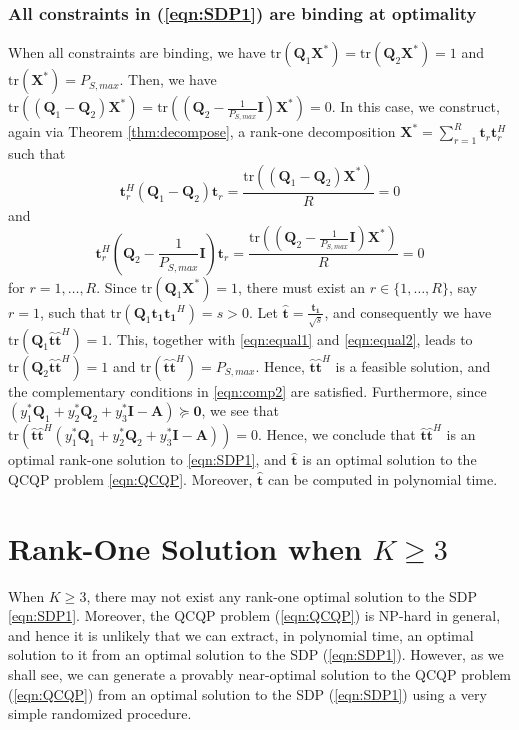 \documentclass[twocolumn,10pt]{IEEEtran}
\theoremstyle{plain} \newtheorem{theorem}{Theorem}
\theoremstyle{plain} \newtheorem{proposition}{Proposition}
\theoremstyle{plain} \newtheorem{corollary}{Corollary}
\theoremstyle{remark} \newtheorem{remark}{Remark}
\theoremstyle{remark} \newtheorem{lemma}{Lemma}
\theoremstyle{plain} \newtheorem{definition}{Definition}
\theoremstyle{plain} \newtheorem{assumption}{Assumption}
\theoremstyle{plain} \newtheorem{fact}{Fact}
\begin{document}
\subsubsection{\textbf{All constraints in (\ref{eqn:SDP1}) are binding at optimality}}
When all constraints are binding, we have $\mathrm{tr}(\mathbf{Q}_1\mathbf{X}^*)=\mathrm{tr}(\mathbf{Q}_2\mathbf{X}^*)=1$ and $\mathrm{tr}(\mathbf{X}^*)=P_{S,max}$. Then, we have $\mathrm{tr}((\mathbf{Q}_1-\mathbf{Q}_2)\mathbf{X}^*)=\mathrm{tr}((\mathbf{Q}_2-\frac{1}{P_{S,max}}\mathbf{I})\mathbf{X}^*)=0$.  In this case, we construct, again via Theorem \ref{thm:decompose}, a rank-one decomposition $\mathbf{X^*}=\sum_{r=1}^R\mathbf{t}_r\mathbf{t}_r^H$ such that
\begin{equation} \label{eqn:equal1}
   \mathbf{t}_r^H\left(\mathbf{Q}_1-\mathbf{Q}_2\right)\mathbf{t}_r = \frac{\mathrm{tr}\left((\mathbf{Q}_1-\mathbf{Q}_2)\mathbf{X^*}\right)}{R} = 0
\end{equation}
and
\begin{equation} \label{eqn:equal2}
   \mathbf{t}_r^H\left(\mathbf{Q}_2-\frac{1}{P_{S,max}}\mathbf{I}\right)\mathbf{t}_r = \frac{\mathrm{tr}\left(\left(\mathbf{Q}_2-\frac{1}{P_{S,max}}\mathbf{I}\right)\mathbf{X^*}\right)}{R} = 0
\end{equation}
for $r=1,\ldots,R$.  Since $\mathrm{tr}(\mathbf{Q}_1\mathbf{X}^*)=1$, there must exist an $r\in\{1,\ldots,R\}$, say $r=1$, such that $\mathrm{tr}(\mathbf{Q}_1\mathbf{t_1}\mathbf{t_1}^H)=s>0$. Let $\mathbf{\hat{t}}=\frac{\mathbf{t_1}}{\sqrt{s}}$, and consequently we have $\mathrm{tr}(\mathbf{Q}_1\mathbf{\hat{t}}\mathbf{\hat{t}}^H)=1$.  This, together with \eqref{eqn:equal1} and \eqref{eqn:equal2}, leads to $\mathrm{tr}(\mathbf{Q}_2\mathbf{\hat{t}}\mathbf{\hat{t}}^H)=1$ and $\mathrm{tr}(\mathbf{\hat{t}}\mathbf{\hat{t}}^H)=P_{S,max}$. Hence, $\mathbf{\hat{t}}\mathbf{\hat{t}}^H$ is a feasible solution, and the complementary conditions in \eqref{eqn:comp2} are satisfied. Furthermore, since $\left(y_1^*\mathbf{Q}_1+y_2^*\mathbf{Q}_2+y_3^*\mathbf{I}-\mathbf{A}\right)\succeq\mathbf{0}$, we see that $\mathrm{tr}\left(\mathbf{\hat{t}}\mathbf{\hat{t}}^H\left(y_1^*\mathbf{Q}_1+y_2^*\mathbf{Q}_2+y_3^*\mathbf{I}-\mathbf{A}\right)\right)=0$.  Hence, we conclude that $\mathbf{\hat{t}}\mathbf{\hat{t}}^H$ is an optimal rank-one solution to \eqref{eqn:SDP1}, and $\mathbf{\hat{t}}$ is an optimal solution to the QCQP problem \eqref{eqn:QCQP}. Moreover, $\mathbf{\hat{t}}$ can be computed in polynomial time.

\section{Rank-One Solution when $K\geq3$}\label{sec:largeK}
When $K\ge3$, there may not exist any rank-one optimal solution to the SDP \eqref{eqn:SDP1}.  Moreover, the QCQP problem (\ref{eqn:QCQP}) is NP-hard in general, and hence it is unlikely that we can extract, in polynomial time, an optimal solution to it from an optimal solution to the SDP (\ref{eqn:SDP1}).  However, as we shall see, we can generate a provably near-optimal solution to the QCQP problem (\ref{eqn:QCQP}) from an optimal solution to the SDP (\ref{eqn:SDP1}) using a very simple randomized procedure.
\end{document}
